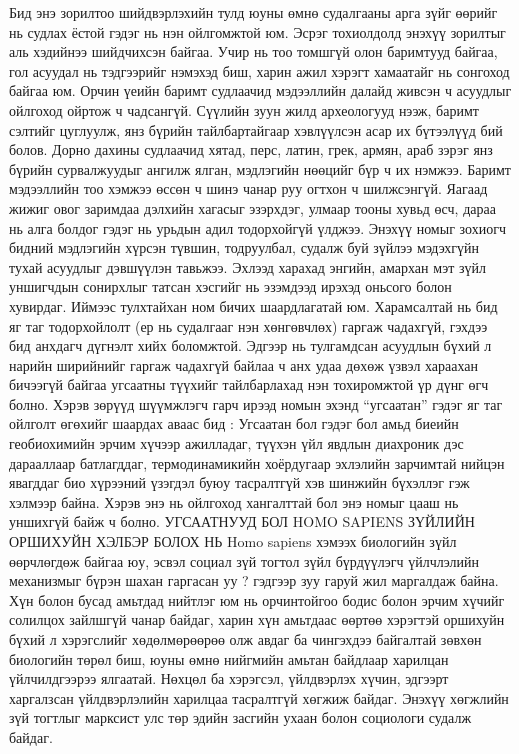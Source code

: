 Бид энэ зорилтоо шийдвэрлэхийн тулд юуны өмнө судалгааны арга зүйг өөрийг нь судлах ёстой гэдэг нь нэн ойлгомжтой юм. Эсрэг тохиолдолд энэхүү зорилтыг аль хэдийнээ шийдчихсэн байгаа. Учир нь тоо томшгүй олон баримтууд байгаа, гол асуудал нь тэдгээрийг нэмэхэд биш, харин ажил хэрэгт хамаатайг нь сонгоход байгаа юм. Орчин үеийн баримт судлаачид мэдээллийн далайд живсэн ч асуудлыг ойлгоход ойртож ч чадсангүй. Сүүлийн зуун жилд археологууд нээж, баримт сэлтийг цуглуулж, янз бүрийн тайлбартайгаар хэвлүүлсэн асар их бүтээлүүд бий болов. Дорно дахины судлаачид хятад, перс, латин, грек, армян, араб зэрэг янз бүрийн сурвалжуудыг ангилж ялган, мэдлэгийн нөөцийг бүр ч их нэмжээ. Баримт мэдээллийн тоо хэмжээ өссөн ч шинэ чанар руу огтхон ч шилжсэнгүй. Яагаад жижиг овог заримдаа дэлхийн хагасыг эзэрхдэг, улмаар тооны хувьд өсч, дараа нь алга болдог гэдэг нь урьдын адил тодорхойгүй үлджээ.
Энэхүү номыг зохиогч бидний мэдлэгийн хүрсэн түвшин, тодруулбал, судалж буй зүйлээ мэдэхгүйн тухай асуудлыг дэвшүүлэн тавьжээ. Эхлээд харахад энгийн, амархан мэт зүйл уншигчдын сонирхлыг татсан хэсгийг нь эзэмдээд ирэхэд оньсого болон хувирдаг. Иймээс тулхтайхан ном бичих шаардлагатай юм. Харамсалтай нь бид яг таг тодорхойлолт (ер нь судалгааг нэн хөнгөвчлөх) гаргаж чадахгүй, гэхдээ бид анхдагч дүгнэлт хийх боломжтой. Эдгээр нь тулгамдсан асуудлын бүхий л нарийн ширийнийг гаргаж чадахгүй байлаа ч анх удаа дөхөж үзвэл хараахан бичээгүй байгаа угсаатны түүхийг тайлбарлахад нэн тохиромжтой үр дүнг өгч болно. Хэрэв зөрүүд шүүмжлэгч гарч ирээд номын эхэнд “угсаатан” гэдэг яг таг ойлголт өгөхийг шаардах аваас бид : Угсаатан бол гэдэг бол амьд биеийн геобиохимийн эрчим хүчээр ажилладаг, түүхэн үйл явдлын диахроник дэс дарааллаар батлагддаг, термодинамикийн хоёрдугаар эхлэлийн зарчимтай нийцэн явагддаг био хүрээний үзэгдэл буюу тасралтгүй хэв шинжийн бүхэллэг гэж хэлмээр байна. Хэрэв энэ нь ойлгоход хангалттай бол энэ номыг цааш нь уншихгүй байж ч болно.
УГСААТНУУД БОЛ HOMO SAPIENS ЗҮЙЛИЙН ОРШИХУЙН ХЭЛБЭР БОЛОХ НЬ
Homo sapiens хэмээх биологийн зүйл өөрчлөгдөж байгаа юу, эсвэл социал зүй тогтол зүйл бүрдүүлэгч үйлчлэлийн механизмыг бүрэн шахан гаргасан уу ? гэдгээр зуу гаруй жил маргалдаж байна. Хүн болон бусад амьтдад нийтлэг юм нь орчинтойгоо бодис болон эрчим хүчийг солилцох зайлшгүй чанар байдаг, харин хүн амьтдаас өөртөө хэрэгтэй оршихуйн бүхий л хэрэгслийг хөдөлмөрөөрөө олж авдаг ба чингэхдээ байгалтай зөвхөн биологийн төрөл биш, юуны өмнө нийгмийн амьтан байдлаар харилцан үйлчилдгээрээ ялгаатай. Нөхцөл ба хэрэгсэл, үйлдвэрлэх хүчин, эдгээрт харгалзсан үйлдвэрлэлийн харилцаа тасралтгүй хөгжиж байдаг. Энэхүү хөгжлийн зүй тогтлыг марксист улс төр эдийн засгийн ухаан болон социологи судалж байдаг.
